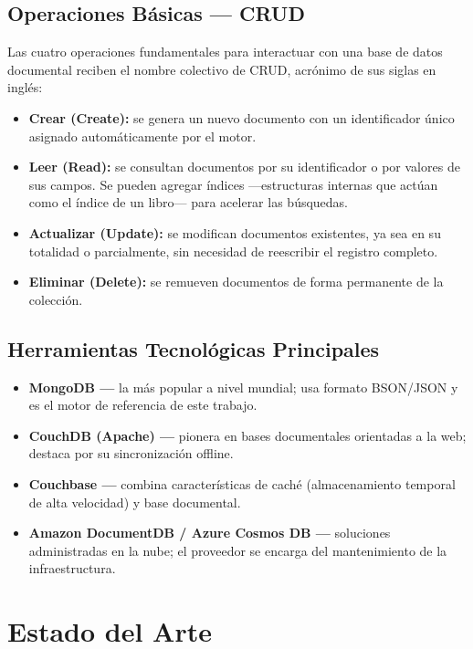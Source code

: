 \documentclass[conference]{IEEEtran}
\begin{document}
\subsection{Operaciones Básicas — CRUD}
Las cuatro operaciones fundamentales para interactuar con una base de datos documental reciben el nombre colectivo de CRUD, acrónimo de sus siglas en inglés:
\begin{itemize}
    \item \textbf{Crear (Create):} se genera un nuevo documento con un identificador único asignado automáticamente por el motor.
    \item \textbf{Leer (Read):} se consultan documentos por su identificador o por valores de sus campos. Se pueden agregar índices —estructuras internas que actúan como el índice de un libro— para acelerar las búsquedas.
    \item \textbf{Actualizar (Update):} se modifican documentos existentes, ya sea en su totalidad o parcialmente, sin necesidad de reescribir el registro completo.
    \item \textbf{Eliminar (Delete):} se remueven documentos de forma permanente de la colección.
\end{itemize}

\subsection{Herramientas Tecnológicas Principales}
\begin{itemize}
    \item \textbf{MongoDB —} la más popular a nivel mundial; usa formato BSON/JSON y es el motor de referencia de este trabajo.
    \item \textbf{CouchDB (Apache) —} pionera en bases documentales orientadas a la web; destaca por su sincronización offline.
    \item \textbf{Couchbase —} combina características de caché (almacenamiento temporal de alta velocidad) y base documental.
    \item \textbf{Amazon DocumentDB / Azure Cosmos DB —} soluciones administradas en la nube; el proveedor se encarga del mantenimiento de la infraestructura.
\end{itemize}

\section{Estado del Arte}
\end{document}
